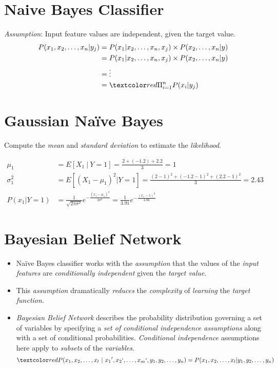 \documentclass[
	number={3},
	title={Na\:ive Bayes Learning}
]{cs584notes}
\begin{document}
\section{Na\:ive Bayes Classifier}\label{sec:naive-bayes-classifier}
\emph{Assumption}: Input feature values are independent, given the target value.
\begin{equation*}
\begin{aligned}
	P(x_{1}, x_{2}, \dots, x_{n} | y_{j}) &= P(x_{1} | x_{2}, \dots, x_{n}, x_{j}) \times P(x_{2}, \dots, x_{n} | y)\\
										  &= P(x_{1} | x_{2}, \dots, x_{n}, x_{j}) \times P(x_{2}, \dots, x_{n} | y)\\
	&=\vdots\\
	&= \data{ \Pi_{i=1}^{n} P(x_{i} | y_{j}) }
\end{aligned}
\end{equation*}

\section{Gaussian Naïve Bayes}\label{sec:gaussian-naive-bayes}
Compute the \emph{mean} and \emph{standard deviation} to estimate the \emph{likelihood}.

\begin{equation*}
	\begin{aligned}
		\mu_{1} &= E[X_{1}\ |\ Y = 1] = \frac{2 + (-1.2)  + 2.2}{3} = 1\\
		\sigma_{1}^{2} &= E\left[ (X_{1} - \mu_{1})^{2} | Y = 1 \right] = \frac{(2-1)^{2} + (-1.2 - 1)^{2} + (2.2 - 1)^{2}}{3} = 2.43\\
		P(x_{1} | Y=1 ) &= \frac{1}{\sqrt{2\pi\sigma^{2}}}e^{-\frac{(x_{1} - \mu_{1})^{2}}{2\sigma^{2}}} = \frac{1}{3.91}e^{-\frac{(x_{1} - 1)^{2}}{4.86}}
	\end{aligned}
\end{equation*}

\section{Bayesian Belief Network}\label{sec:bayesian-belief-network}
\begin{itemize}
	\item Naïve Bayes classifier works with the \emph{assumption} that the values of the \emph{input features} are \emph{conditionally independent} given the \emph{target value}.
	\item This \emph{assumption} dramatically \emph{reduces} the \emph{complexity} of \emph{learning} the \emph{target function}.
	\item \emph{Bayesian Belief Network} describes the probability distribution governing a set of variables by specifying a \emph{set of conditional independence assumptions} along with a set of conditional probabilities. \emph{Conditional independence} assumptions here apply to \emph{subsets} of the \emph{variables}.
	\[ \data{ P(x_{1}, x_{2}, \dots, x_{l}\ |\ x_{1}{'}, x_{2}{`}, \dots, x_{m}{`}, y_{1}, y_{2}, \dots, y_{n}) = P(x_{1}, x_{2}, \dots, x_{l} | y_{1}, y_{2}, \dots, y_{n}) } \]
\end{itemize}
\end{document}
